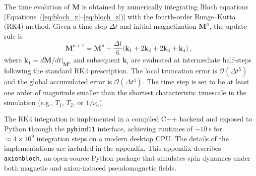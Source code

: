 
The time evolution of $\mathbf{M}$ is obtained by numerically integrating Bloch equations [Equations~(\ref{eq:bloch_x}--\ref{eq:bloch_z})] with the fourth-order Runge--Kutta (RK4) method. 
Given a time step $\Delta t$ and initial magnetization $\mathbf{M}^n$, the update rule is
\begin{equation}
    \mathbf{M}^{n+1}
    = \mathbf{M}^n
    + \frac{\Delta t}{6}\bigl(\mathbf{k}_1 + 2\mathbf{k}_2 + 2\mathbf{k}_3 + \mathbf{k}_4\bigr)\,,
\end{equation}
where $\mathbf{k}_1 = d\mathbf{M}/dt|_{\mathbf{M}^n}$ and subsequent $\mathbf{k}_i$ are evaluated at intermediate half-steps following the standard RK4 prescription. 
The local truncation error is $\mathcal{O}(\Delta t^5)$ and the global accumulated error is $\mathcal{O}(\Delta t^4)$. 
The time step is set to be at least one order of magnitude smaller than the shortest characteristic timescale in the simulation (e.g., $T_1$, $T_2$, or $1/\nu_a$).

The RK4 integration is implemented in a compiled C++ backend and exposed to Python through the \texttt{pybind11} interface, achieving runtimes of $\sim\SI{10}{\s}$ for $\approx4\times10^9$ integration steps on a modern desktop CPU.
The details of the implementations are included in the appendix. 
This appendix describes \texttt{axionbloch}, an open-source Python package that simulates spin dynamics under both magnetic and axion-induced pseudomagnetic fields.

